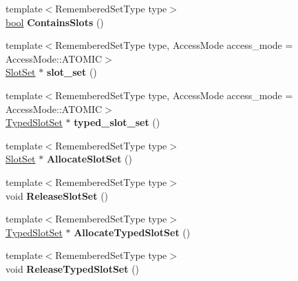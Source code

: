 \begin{DoxyCompactItemize}
{\footnotesize template$<$Remembered\+Set\+Type type$>$ }\\\mbox{\hyperlink{classbool}{bool}} {\bfseries Contains\+Slots} ()
\item 
\mbox{\label{classv8_1_1internal_1_1MemoryChunk_a7f6c180e7200490066d6645a52a671fe}} 
{\footnotesize template$<$Remembered\+Set\+Type type, Access\+Mode access\+\_\+mode = Access\+Mode\+::\+A\+T\+O\+M\+IC$>$ }\\\mbox{\hyperlink{classv8_1_1internal_1_1SlotSet}{Slot\+Set}} $\ast$ {\bfseries slot\+\_\+set} ()
\item 
\mbox{\label{classv8_1_1internal_1_1MemoryChunk_a1dafbdff643251c01d1e822bc1fef8b0}} 
{\footnotesize template$<$Remembered\+Set\+Type type, Access\+Mode access\+\_\+mode = Access\+Mode\+::\+A\+T\+O\+M\+IC$>$ }\\\mbox{\hyperlink{classv8_1_1internal_1_1TypedSlotSet}{Typed\+Slot\+Set}} $\ast$ {\bfseries typed\+\_\+slot\+\_\+set} ()
\item 
\mbox{\label{classv8_1_1internal_1_1MemoryChunk_a08112d7d814df956c119ef6dc582fb6e}} 
{\footnotesize template$<$Remembered\+Set\+Type type$>$ }\\\mbox{\hyperlink{classv8_1_1internal_1_1SlotSet}{Slot\+Set}} $\ast$ {\bfseries Allocate\+Slot\+Set} ()
\item 
\mbox{\label{classv8_1_1internal_1_1MemoryChunk_a6f3ec67a9aafee4912544625f91b7146}} 
{\footnotesize template$<$Remembered\+Set\+Type type$>$ }\\void {\bfseries Release\+Slot\+Set} ()
\item 
\mbox{\label{classv8_1_1internal_1_1MemoryChunk_a59d405c9ddca2ff77bb79ffb8e21c8ee}} 
{\footnotesize template$<$Remembered\+Set\+Type type$>$ }\\\mbox{\hyperlink{classv8_1_1internal_1_1TypedSlotSet}{Typed\+Slot\+Set}} $\ast$ {\bfseries Allocate\+Typed\+Slot\+Set} ()
\item 
\mbox{\label{classv8_1_1internal_1_1MemoryChunk_a390bca0c016b5dce97a3246e678a24c3}} 
{\footnotesize template$<$Remembered\+Set\+Type type$>$ }\\void {\bfseries Release\+Typed\+Slot\+Set} ()

\end{DoxyCompactItemize}
